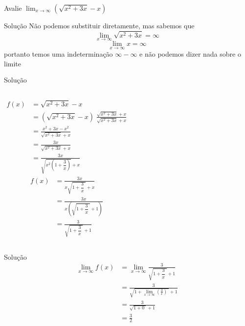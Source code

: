 \begin{question}
  Avalie
  \(
    \lim_{x \to \infty} \left(\sqrt{x^2+3x} - x\right)
  \)
\end{question}

\begin{resolution}{Solução}
  Não podemos substituir diretamente, mas sabemos que
  \[
    \lim_{x \to \infty} \sqrt{x^2+3x} = \infty
  \]
  \[
    \lim_{x \to \infty} x = \infty
  \]
  portanto temos uma indeterminação \(\infty-\infty\)
  e não podemos dizer nada sobre o limite
\end{resolution}

\begin{resolution}{Solução}
\begin{columns}[t]
  \begin{align*}
    f(x)
    & = \sqrt{x^2+3x} - x \\
    & = \left(\sqrt{x^2+3x} - x\right)\; \frac{\sqrt{x^2+3x} + x}{\sqrt{x^2+3x} + x} \\
    & = \frac{x^2+3x - x^2}{\sqrt{x^2+3x} + x} \\
    & = \frac{3x}{\sqrt{x^2+3x} + x} \\
    & = \frac{3x}{\sqrt{x^2\left(1+\dfrac{3}{x}\right)} + x}
  \end{align*}
  \begin{align*}
    f(x)
    & = \frac{3x}{x\sqrt{1+\dfrac{3}{x}\;} + x} \\
    & = \frac{3x}{x\left(\sqrt{1+\dfrac{3}{x}\;} + 1\right)} \\
    & = \frac{3}{\sqrt{1+\dfrac{3}{x}\;} + 1}
  \end{align*}
\end{columns}
\end{resolution}

\begin{resolution}{Solução}
  \begin{align*}
    \lim_{x \to \infty} f(x)
    & = \lim_{x \to \infty} \frac{3}{\sqrt{1+\dfrac{3}{x}\;} + 1} \\
    & = \frac{3}{\sqrt{\displaystyle 1+\lim_{x \to \infty}\left(\frac{3}{x}\right)\;} + 1} \\
    & = \frac{3}{\sqrt{1+0\;} + 1} \\
    & = \frac{3}{2}
  \end{align*}
\end{resolution}

